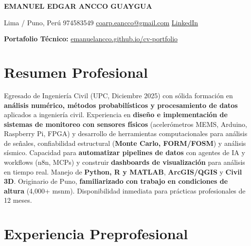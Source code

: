 \documentclass[10pt, a4paper]{article}
\begin{document}
\begin{center}
    {\Huge\bfseries EMANUEL EDGAR ANCCO GUAYGUA}
    \vspace{2mm}

    \faMapMarker*{} Lima / Puno, Perú \quad
    \faPhone*{} 974583549 \quad
    \faEnvelope{} \href{mailto:coarp.eancco@gmail.com}{coarp.eancco@gmail.com} \quad
    \faLinkedin{} \href{https://www.linkedin.com/in/emanuel-edgar-ancco-guaygua-a61210352}{LinkedIn}

    \faGlobe{} \textbf{Portafolio Técnico:} \href{https://emanuelancco.github.io/cv-portfolio/}{emanuelancco.github.io/cv-portfolio}
\end{center}

\section*{Resumen Profesional}
Egresado de Ingeniería Civil (UPC, Diciembre 2025) con sólida formación en \textbf{análisis numérico, métodos probabilísticos y procesamiento de datos} aplicados a ingeniería civil. Experiencia en \textbf{diseño e implementación de sistemas de monitoreo con sensores físicos} (acelerómetros MEMS, Arduino, Raspberry Pi, FPGA) y desarrollo de herramientas computacionales para análisis de señales, confiabilidad estructural (\textbf{Monte Carlo, FORM/FOSM}) y análisis sísmico. Capacidad para \textbf{automatizar pipelines de datos} con agentes de IA y workflows (n8n, MCPs) y construir \textbf{dashboards de visualización} para análisis en tiempo real. Manejo de \textbf{Python, R y MATLAB}, \textbf{ArcGIS/QGIS} y \textbf{Civil 3D}. Originario de Puno, \textbf{familiarizado con trabajo en condiciones de altura} (4,000+ msnm). Disponibilidad inmediata para prácticas profesionales de 12 meses.

\vspace{1mm}
\begin{center}
\end{center}

\section*{Experiencia Preprofesional}
\end{document}
